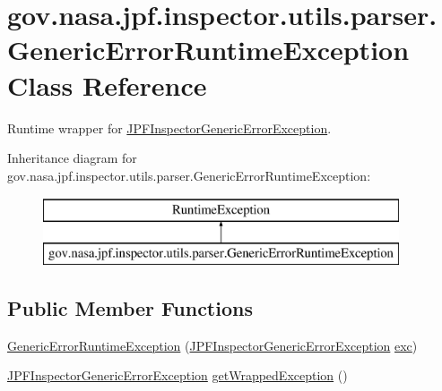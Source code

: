 \hypertarget{classgov_1_1nasa_1_1jpf_1_1inspector_1_1utils_1_1parser_1_1_generic_error_runtime_exception}{}\section{gov.\+nasa.\+jpf.\+inspector.\+utils.\+parser.\+Generic\+Error\+Runtime\+Exception Class Reference}
\label{classgov_1_1nasa_1_1jpf_1_1inspector_1_1utils_1_1parser_1_1_generic_error_runtime_exception}


Runtime wrapper for \hyperlink{}{J\+P\+F\+Inspector\+Generic\+Error\+Exception}.  


Inheritance diagram for gov.\+nasa.\+jpf.\+inspector.\+utils.\+parser.\+Generic\+Error\+Runtime\+Exception\+:\begin{figure}[H]
\begin{center}
\leavevmode
\includegraphics[height=2.000000cm]{classgov_1_1nasa_1_1jpf_1_1inspector_1_1utils_1_1parser_1_1_generic_error_runtime_exception}
\end{center}
\end{figure}
\subsection*{Public Member Functions}
\begin{DoxyCompactItemize}
\item 
\hyperlink{classgov_1_1nasa_1_1jpf_1_1inspector_1_1utils_1_1parser_1_1_generic_error_runtime_exception_a11c68c2f59fa19461cd745aed2ddc2f6}{Generic\+Error\+Runtime\+Exception} (\hyperlink{classgov_1_1nasa_1_1jpf_1_1inspector_1_1exceptions_1_1_j_p_f_inspector_generic_error_exception}{J\+P\+F\+Inspector\+Generic\+Error\+Exception} \hyperlink{classgov_1_1nasa_1_1jpf_1_1inspector_1_1utils_1_1parser_1_1_generic_error_runtime_exception_a9e1bc226c1606c43c4f3d7901af26a43}{exc})
\item 
\hyperlink{classgov_1_1nasa_1_1jpf_1_1inspector_1_1exceptions_1_1_j_p_f_inspector_generic_error_exception}{J\+P\+F\+Inspector\+Generic\+Error\+Exception} \hyperlink{classgov_1_1nasa_1_1jpf_1_1inspector_1_1utils_1_1parser_1_1_generic_error_runtime_exception_a4993080260e1fcf7f24c655f4dd520ea}{get\+Wrapped\+Exception} ()
\end{DoxyCompactItemize}
